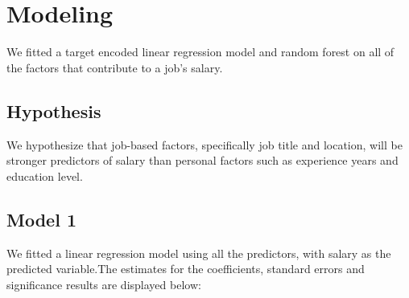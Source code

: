 \documentclass[
]{article}
\begin{document}
\newpage

\section{Modeling}\label{modeling}

We fitted a target encoded linear regression model and random forest on
all of the factors that contribute to a job's salary.

\subsection{Hypothesis}\label{hypothesis}

We hypothesize that job-based factors, specifically job title and
location, will be stronger predictors of salary than personal factors
such as experience years and education level.

\subsection{Model 1}\label{model-1}

We fitted a linear regression model using all the predictors, with
salary as the predicted variable.The estimates for the coefficients,
standard errors and significance results are displayed below:
\end{document}
